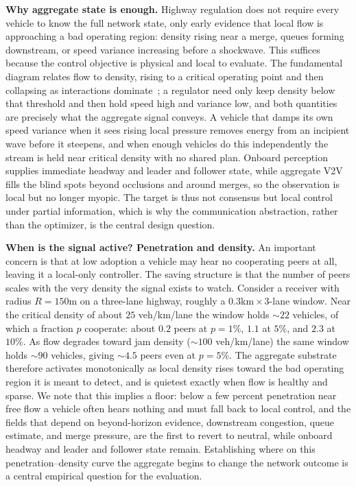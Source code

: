 \noindent\textbf{Why aggregate state is enough.}
Highway regulation does not require every vehicle to know the full network state, only early evidence that local flow is approaching a bad operating region: density rising near a merge, queues forming downstream, or speed variance increasing before a shockwave. This suffices because the control objective is physical and local to evaluate. The fundamental diagram relates flow to density, rising to a critical operating point and then collapsing as interactions dominate~\cite{greenshields1935study,lighthill1955kinematic,richards1956shock}; a regulator need only keep density below that threshold and then hold speed high and variance low, and both quantities are precisely what the aggregate signal conveys. A vehicle that damps its own speed variance when it sees rising local pressure removes energy from an incipient wave before it steepens, and when enough vehicles do this independently the stream is held near critical density with no shared plan. Onboard perception supplies immediate headway and leader and follower state, while aggregate V2V fills the blind spots beyond occlusions and around merges, so the observation is local but no longer myopic. The target is thus not consensus but local control under partial information, which is why the communication abstraction, rather than the optimizer, is the central design question.

\noindent\textbf{When is the signal active? Penetration and density.}
An important concern is that at low adoption a vehicle may hear no cooperating peers at all, leaving it a local-only controller. The saving structure is that the number of peers scales with the very density the signal exists to watch. Consider a receiver with radius \(R=150\)m on a three-lane highway, roughly a \(0.3\)km\,\(\times\,3\)-lane window. Near the critical density of about \(25\) veh/km/lane the window holds \(\sim\!22\) vehicles, of which a fraction \(p\) cooperate: about \(0.2\) peers at \(p=1\%\), \(1.1\) at \(5\%\), and \(2.3\) at \(10\%\). As flow degrades toward jam density (\(\sim\!100\) veh/km/lane) the same window holds \(\sim\!90\) vehicles, giving \(\sim\!4.5\) peers even at \(p=5\%\). The aggregate substrate therefore activates monotonically as local density rises toward the bad operating region it is meant to detect, and is quietest exactly when flow is healthy and sparse. We note that this implies a floor: below a few percent penetration near free flow a vehicle often hears nothing and must fall back to local control, and the fields that depend on beyond-horizon evidence, downstream congestion, queue estimate, and merge pressure, are the first to revert to neutral, while onboard headway and leader and follower state remain. Establishing where on this penetration--density curve the aggregate begins to change the network outcome is a central empirical question for the evaluation.

